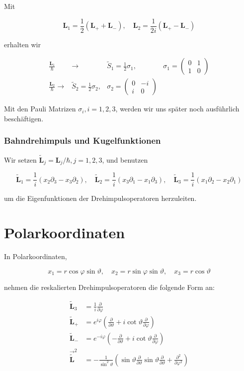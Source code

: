 \documentclass[10pt, letterpaper]{article}
\begin{document}
Mit

$$
\mathbf{L}_{1}=\frac{1}{2}\left(\mathbf{L}_{+}+\mathbf{L}_{-}\right), \quad \mathbf{L}_{2}=\frac{1}{2 i}\left(\mathbf{L}_{+}-\mathbf{L}_{-}\right)
$$

erhalten wir

$$
\begin{array}{rlrl}
\frac{\mathbf{L}_{1}}{\hbar} & \rightarrow & \tilde{S}_{1}=\frac{1}{2} \sigma_{1}, & \sigma_{1}=\left(\begin{array}{cc}
0 & 1 \\
1 & 0
\end{array}\right) \\
\frac{\mathbf{L}_{2}}{\hbar} \rightarrow & \tilde{S}_{2}=\frac{1}{2} \sigma_{2}, & \sigma_{2}=\left(\begin{array}{cc}
0 & -i \\
i & 0
\end{array}\right)
\end{array}
$$

Mit den Pauli Matrizen $\sigma_{i}, i=1,2,3$, werden wir uns später noch ausführlich beschäftigen.

\subsubsection*{Bahndrehimpuls und Kugelfunktionen}
Wir setzen $\tilde{\mathbf{L}}_{j}=\mathbf{L}_{j} / \hbar, j=1,2,3$, und benutzen

$$
\tilde{\mathbf{L}}_{1}=\frac{1}{i}\left(x_{2} \partial_{3}-x_{3} \partial_{2}\right), \quad \tilde{\mathbf{L}}_{2}=\frac{1}{i}\left(x_{3} \partial_{1}-x_{1} \partial_{3}\right), \quad \tilde{\mathbf{L}}_{3}=\frac{1}{i}\left(x_{1} \partial_{2}-x_{2} \partial_{1}\right)
$$

um die Eigenfunktionen der Drehimpulsoperatoren herzuleiten.

\section*{Polarkoordinaten}
In Polarkoordinaten,

$$
x_{1}=r \cos \varphi \sin \vartheta, \quad x_{2}=r \sin \varphi \sin \vartheta, \quad x_{3}=r \cos \vartheta
$$

nehmen die reskalierten Drehimpulsoperatoren die folgende Form an:

$$
\begin{aligned}
\tilde{\mathbf{L}}_{3} & =\frac{1}{i} \frac{\partial}{\partial \varphi} \\
\tilde{\mathbf{L}}_{+} & =e^{i \varphi}\left(\frac{\partial}{\partial \vartheta}+i \cot \vartheta \frac{\partial}{\partial \varphi}\right) \\
\tilde{\mathbf{L}}_{-} & =e^{-i \varphi}\left(-\frac{\partial}{\partial \vartheta}+i \cot \vartheta \frac{\partial}{\partial \varphi}\right) \\
\overrightarrow{\tilde{\mathbf{L}}}^{2} & =-\frac{1}{\sin ^{2} \vartheta}\left(\sin \vartheta \frac{\partial}{\partial \vartheta} \sin \vartheta \frac{\partial}{\partial \vartheta}+\frac{\partial^{2}}{\partial \varphi^{2}}\right)
\end{aligned}
$$
\end{document}
